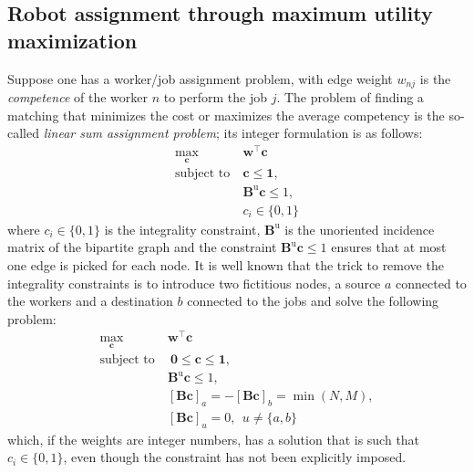 \documentclass[11pt,draftclsnofoot,onecolumn]{IEEEtran}
\begin{document}
\subsection{Robot assignment through maximum utility maximization}
Suppose one has a worker/job assignment problem, with edge weight $w_{nj}$ is the {\it competence} of the worker $n $ to perform the job $j$. The problem of finding a matching that minimizes the cost or maximizes the average competency is the so-called {\it linear sum assignment problem}; its integer formulation is as follows:
\begin{align}
\max_{\bm c} &~\bm w^\top \bm c\\
\mbox{subject to}&~\bm c\leq \bm 1,\\ 
&~\bm B^{\text{u}}\bm c\leq 1,\\  
&~c_i \in \{0,1\}
\end{align}
where $c_i \in \{0,1\}$ is the integrality constraint, $\bm B^{\text{u}}$ is the unoriented incidence matrix of the bipartite graph and the constraint $\bm B^{\text{u}}\bm c\leq 1$ ensures that at most one edge is picked for each node. 
It is well known that the trick to remove the integrality constraints is to introduce two fictitious nodes, a source $a$ connected to the workers and a destination $b$ connected to the jobs and solve the following problem:
\begin{align}
\max_{\bm c} &~\bm w^\top \bm c\\
\mbox{subject to}&~~\bm 0\leq \bm c\leq \bm 1,\\ 
&~\bm B^{\text{u}}\bm c\leq 1,\\  
    &~[\bm B\bm c]_a=-[\bm B\bm c]_b=\min(N, M),\\
      &~[\bm B\bm c]_u=0,~~u\neq \{a,b\}  
\end{align}
which, if the weights are integer numbers, has a solution that is such that $c_i \in \{0,1\}$, even though the constraint has not been explicitly imposed. 
\end{document}
